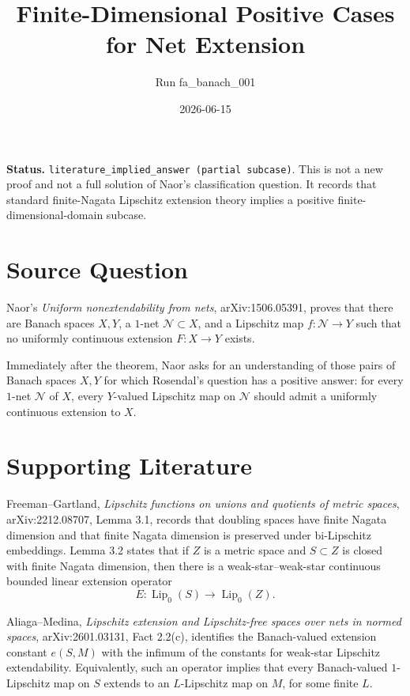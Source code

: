 \documentclass[11pt]{amsart}
\begin{document}
\title{Finite-Dimensional Positive Cases for Net Extension}
\author{Run fa\_banach\_001}
\date{2026-06-15}
\maketitle

\noindent
\textbf{Status.} \texttt{literature\_implied\_answer (partial subcase)}.
This is not a new proof and not a full solution of Naor's classification
question. It records that standard finite-Nagata Lipschitz extension theory
implies a positive finite-dimensional-domain subcase.

\section*{Source Question}

Naor's \emph{Uniform nonextendability from nets}, arXiv:1506.05391, proves
that there are Banach spaces \(X,Y\), a \(1\)-net \(\mathscr N\subset X\),
and a Lipschitz map \(f:\mathscr N\to Y\) such that no uniformly continuous
extension \(F:X\to Y\) exists.

Immediately after the theorem, Naor asks for an understanding of those pairs
of Banach spaces \(X,Y\) for which Rosendal's question has a positive answer:
for every \(1\)-net \(\mathscr N\) of \(X\), every \(Y\)-valued Lipschitz map
on \(\mathscr N\) should admit a uniformly continuous extension to \(X\).

\section*{Supporting Literature}

Freeman--Gartland, \emph{Lipschitz functions on unions and quotients of metric
spaces}, arXiv:2212.08707, Lemma 3.1, records that doubling spaces have finite
Nagata dimension and that finite Nagata dimension is preserved under
bi-Lipschitz embeddings. Lemma 3.2 states that if \(Z\) is a metric space and
\(S\subset Z\) is closed with finite Nagata dimension, then there is a
weak-star--weak-star continuous bounded linear extension operator
\[
  E:\operatorname{Lip}_0(S)\longrightarrow \operatorname{Lip}_0(Z).
\]

Aliaga--Medina, \emph{Lipschitz extension and Lipschitz-free spaces over nets
in normed spaces}, arXiv:2601.03131, Fact 2.2(c), identifies the Banach-valued
extension constant \(e(S,M)\) with the infimum of the constants for weak-star
Lipschitz extendability. Equivalently, such an operator implies that every
Banach-valued \(1\)-Lipschitz map on \(S\) extends to an \(L\)-Lipschitz map on
\(M\), for some finite \(L\).
\end{document}
